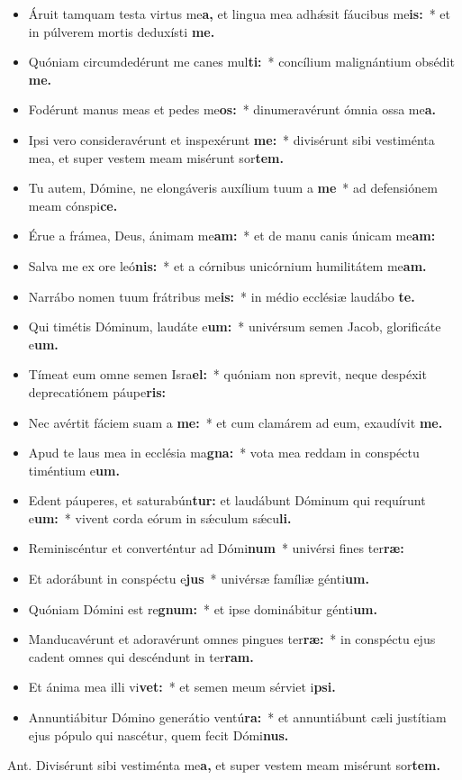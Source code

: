 \begin{multicols}{2}
\begin{itemize}[%
label=\null, %
leftmargin=0pt, %
itemindent=3mm, %
labelsep=0pt, %
labelwidth=0pt, %
rightmargin=0pt, %
parsep=0pt, %
topsep=0pt, %
itemsep=0pt]
\item Áruit tamquam testa virtus me\textbf{a,} et lingua mea adhǽsit fáucibus me\textbf{is:}~* et in púlverem mortis deduxísti \textbf{me.}
\item Quóniam circumdedérunt me canes mul\textbf{ti:}~* concílium malignántium obsédit \textbf{me.}
\item Fodérunt manus meas et pedes me\textbf{os:}~* dinumeravérunt ómnia ossa me\textbf{a.}
\item Ipsi vero consideravérunt et inspexérunt \textbf{me:}~* divisérunt sibi vestiménta mea, et super vestem meam misérunt sor\textbf{tem.}
\item Tu autem, Dómine, ne elongáveris auxílium tuum a \textbf{me}~* ad defensiónem meam cónspi\textbf{ce.}
\item Érue a frámea, Deus, ánimam me\textbf{am:}~* et de manu canis únicam me\textbf{am:}
\item Salva me ex ore leó\textbf{nis:}~* et a córnibus unicórnium humilitátem me\textbf{am.}
\item Narrábo nomen tuum frátribus me\textbf{is:}~* in médio ecclésiæ laudábo \textbf{te.}
\item Qui timétis Dóminum, laudáte e\textbf{um:}~* univérsum semen Jacob, glorificáte e\textbf{um.}
\item Tímeat eum o\-mne semen Isra\textbf{el:}~* quóniam non sprevit, neque despéxit deprecatiónem páupe\textbf{ris:}
\item Nec avértit fáciem suam a \textbf{me:}~* et cum clamárem ad eum, exaudívit \textbf{me.}
\item Apud te laus mea in ecclésia ma\textbf{gna:}~* vota mea reddam in conspéctu timéntium e\textbf{um.}
\item Edent páuperes, et saturabún\textbf{tur:} et laudábunt Dóminum qui requírunt e\textbf{um:}~* vivent corda eórum in sǽculum sǽcu\textbf{li.}
\item Reminiscéntur et converténtur ad Dómi\textbf{num}~* univérsi fines ter\textbf{ræ:}
\item Et adorábunt in conspéctu e\textbf{jus}~* univérsæ famíliæ génti\textbf{um.}
\item Quóniam Dómini est re\textbf{gnum:}~* et ipse dominábitur génti\textbf{um.}
\item Manducavérunt et adoravérunt o\-mnes pingues ter\textbf{ræ:}~* in conspéctu ejus cadent o\-mnes qui descéndunt in ter\textbf{ram.}
\item Et ánima mea illi vi\textbf{vet:}~* et semen meum sérviet i\textbf{psi.}
\item Annuntiábitur Dómino generátio ventú\textbf{ra:}~* et annuntiábunt cæli justítiam ejus pópulo qui nascétur, quem fecit Dómi\textbf{nus.}
\end{itemize}
\end{multicols}
Ant. Divisérunt sibi vestiménta me\textbf{a,} et super vestem meam misérunt sor\textbf{tem.}

